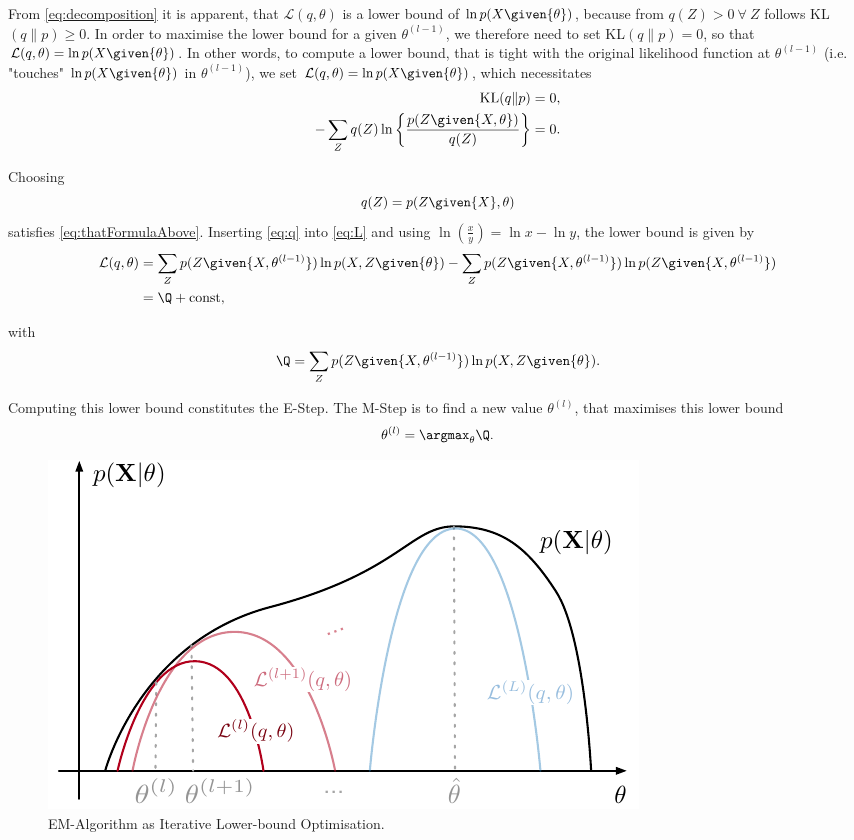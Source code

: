 From \eqref{eq:decomposition} it is apparent, that $\mathcal{L}(q,\theta)$ is a lower bound of $\ln p(X\given{\theta})$, because from $q(Z)>0\ \forall\ Z$ follows KL$(q\|p)\geq0$. In order to maximise the lower bound for a given $\theta^{(l-1)}$, we therefore need to set KL$(q\|p)=0$, so that $\mathcal{L}(q,\theta)=\ln p(X\given{\theta})$. In other words, to compute a lower bound, that is tight with the original likelihood function at $\theta^{(l-1)}$ (i.e. "touches" $\ln p(X\given{\theta})$ in $\theta^{(l-1)}$), we set $\mathcal{L}(q,\theta)=\ln p(X\given{\theta})$, which necessitates
\begin{align}
\label{eq:thatOtherFormulaAbove}
    \text{KL}(q\|p)&=0,\\
    -\sum_{Z}q(Z)\ln\left\{\frac{p(Z\given{X,\theta})}{q(Z)} \right\}&=0.
\label{eq:thatFormulaAbove}
\end{align}

Choosing
\begin{equation}
    q(Z)=p(Z\given{X},\theta)
\label{eq:q}
\end{equation}
satisfies \eqref{eq:thatFormulaAbove}. Inserting \eqref{eq:q} into \eqref{eq:L} and using $\ln(\frac{x}{y})=\ln{x}-\ln{y}$, the lower bound is given by
\begin{align}
    \mathcal{L}(q, \theta)&=\sum_{Z}p(Z\given{X, \theta^{(l-1)}})\ln p(X,Z\given{\theta})-\sum_{Z}p(Z\given{X, \theta^{(l-1)}})\ln p(Z\given{X,\theta^{(l-1)}})\\
    &=\Q+\text{const},
\end{align}

with
\begin{equation}
\label{eq:e-step}
    \Q=\sum_{Z}p(Z\given{X, \theta^{(l-1)}})\ln p(X,Z\given{\theta}).
\end{equation}
    
Computing this lower bound constitutes the E-Step. The M-Step is to find a new value $\theta^{(l)}$, that maximises this lower bound
\begin{equation}
\label{eq:m-step}
    \theta^{(l)} = \argmax_{\theta}\Q.
\end{equation}

\begin{figure}[!hb]
    \centering
    \includegraphics[scale=1]{data/figures/em-Q4}
    \caption[EM-Algorithm as Iterative Lower-bound Optimisation]{EM-Algorithm as Iterative Lower-bound Optimisation.}
    \label{fig:em}
\end{figure}

